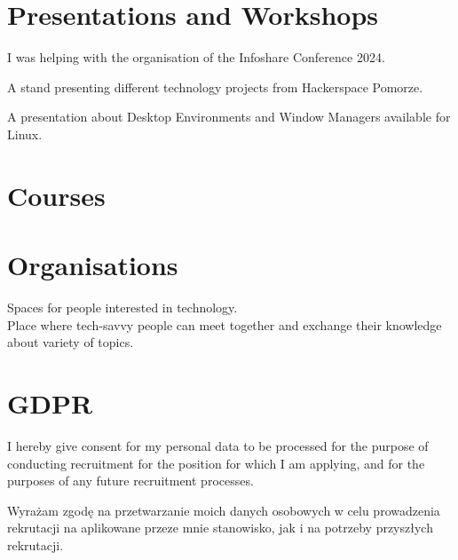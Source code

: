 \documentclass[11pt, a4paper, sans, colorlinks]{moderncv}
\begin{document}

\section{Presentations and Workshops}

{}{}
{I was helping with the organisation of the Infoshare Conference 2024.}

{}{}
{A stand presenting different technology projects from Hackerspace Pomorze.}

{}{}
{A presentation about Desktop Environments and Window Managers available for Linux.}

\section{Courses}


\section{Organisations}

{
	Spaces for people interested in technology.\\
	Place where tech-savvy people can meet together and exchange their knowledge about variety of topics.
}

\section{GDPR}

{I hereby give consent for my personal data to be processed for the purpose of conducting recruitment for the position for which I am applying, and for the purposes of any future recruitment processes.}

{Wyrażam zgodę na przetwarzanie moich danych osobowych w celu prowadzenia rekrutacji na aplikowane przeze mnie stanowisko, jak i na potrzeby przyszłych rekrutacji.}
\end{document}
